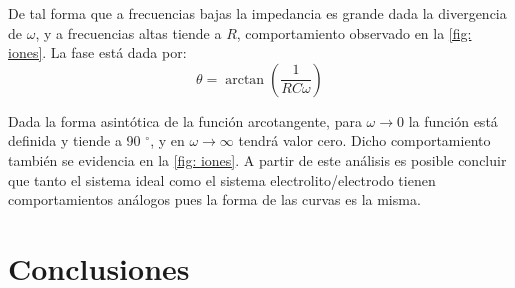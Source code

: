 \documentclass[fleqn,11pt]{SelfArx}
\begin{document}
	De tal forma que a frecuencias bajas la impedancia es grande dada la divergencia de $\omega$, y a frecuencias altas tiende a $R$, comportamiento observado en la \autoref{fig: iones}. La fase est\'a dada por:
	\begin{equation}
		\theta = \arctan\left(\dfrac{1}{RC\omega}\right)
	\end{equation}
	
	Dada la forma asint\'otica de la funci\'on arcotangente, para $\omega\rightarrow0$ la funci\'on est\'a definida y tiende a 90 $^\circ$, y en $\omega\rightarrow\infty$ tendr\'a valor cero. Dicho comportamiento tambi\'en se evidencia en la \autoref{fig: iones}. A partir de este an\'alisis es posible concluir que tanto el sistema ideal como el sistema electrolito/electrodo tienen comportamientos an\'alogos pues la forma de las curvas es la misma.
	
	\section{Conclusiones}
	
	
	
	
	
	
\end{document}

